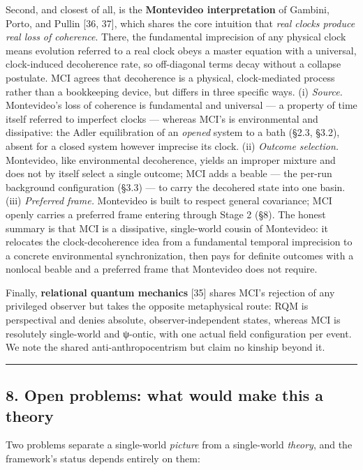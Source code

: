\documentclass[
]{article}
\begin{document}
Second, and closest of all, is the \textbf{Montevideo interpretation} of
Gambini, Porto, and Pullin {[}36, 37{]}, which shares the core intuition
that \emph{real clocks produce real loss of coherence}. There, the
fundamental imprecision of any physical clock means evolution referred
to a real clock obeys a master equation with a universal, clock-induced
decoherence rate, so off-diagonal terms decay without a collapse
postulate. MCI agrees that decoherence is a physical, clock-mediated
process rather than a bookkeeping device, but differs in three specific
ways. (i) \emph{Source.} Montevideo's loss of coherence is fundamental
and universal --- a property of time itself referred to imperfect clocks
--- whereas MCI's is environmental and dissipative: the Adler
equilibration of an \emph{opened} system to a bath (§2.3, §3.2), absent
for a closed system however imprecise its clock. (ii) \emph{Outcome
selection.} Montevideo, like environmental decoherence, yields an
improper mixture and does not by itself select a single outcome; MCI
adds a beable --- the per-run background configuration (§3.3) --- to
carry the decohered state into one basin. (iii) \emph{Preferred frame.}
Montevideo is built to respect general covariance; MCI openly carries a
preferred frame entering through Stage 2 (§8). The honest summary is
that MCI is a dissipative, single-world cousin of Montevideo: it
relocates the clock-decoherence idea from a fundamental temporal
imprecision to a concrete environmental synchronization, then pays for
definite outcomes with a nonlocal beable and a preferred frame that
Montevideo does not require.

Finally, \textbf{relational quantum mechanics} {[}35{]} shares MCI's
rejection of any privileged observer but takes the opposite metaphysical
route: RQM is perspectival and denies absolute, observer-independent
states, whereas MCI is resolutely single-world and ψ-ontic, with one
actual field configuration per event. We note the shared
anti-anthropocentrism but claim no kinship beyond it.

\begin{center}\rule{0.5\linewidth}{0.5pt}\end{center}

\subsection{8. Open problems: what would make this a
theory}\label{open-problems-what-would-make-this-a-theory}

Two problems separate a single-world \emph{picture} from a single-world
\emph{theory}, and the framework's status depends entirely on them:
\end{document}
